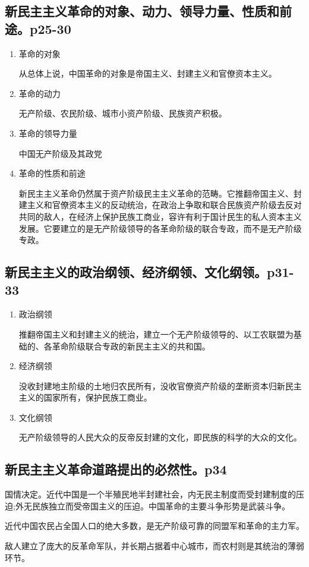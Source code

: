 \documentclass[UTF8]{ctexart}
\begin{document}
\subsection{新民主主义革命的对象、动力、领导力量、性质和前途。p25-30}
\begin{enumerate}[(1)]
\item 革命的对象
\par 从总体上说，中国革命的对象是帝国主义、封建主义和官僚资本主义。
\item 革命的动力
\par 无产阶级、农民阶级、城市小资产阶级、民族资产积极。
\item 革命的领导力量
\par 中国无产阶级及其政党
\item 革命的性质和前途
\par 新民主主义革命仍然属于资产阶级民主主义革命的范畴。它推翻帝国主义、封建主义和官僚资本主义的反动统治，在政治上争取和联合民族资产阶级去反对共同的敌人，在经济上保护民族工商业，容许有利于国计民生的私人资本主义发展。它要建立的是无产阶级领导的各革命阶级的联合专政，而不是无产阶级专政。        
\end{enumerate}
\subsection{新民主主义的政治纲领、经济纲领、文化纲领。p31-33}
\begin{enumerate}[(1)]
\item 政治纲领
\par 推翻帝国主义和封建主义的统治，建立一个无产阶级领导的、以工农联盟为基础的、各革命阶级联合专政的新民主主义的共和国。
\item 经济纲领
\par 没收封建地主阶级的土地归农民所有，没收官僚资产阶级的垄断资本归新民主主义的国家所有，保护民族工商业。
\item 文化纲领
\par 无产阶级领导的人民大众的反帝反封建的文化，即民族的科学的大众的文化。
\end{enumerate}
\subsection{新民主主义革命道路提出的必然性。p34}
\par 国情决定。近代中国是一个半殖民地半封建社会，内无民主制度而受封建制度的压迫;外无民族独立而受帝国主义的压迫。中国革命的主要斗争形势是武装斗争。
\par 近代中国农民占全国人口的绝大多数，是无产阶级可靠的同盟军和革命的主力军。
\par 敌人建立了庞大的反革命军队，并长期占据着中心城市，而农村则是其统治的薄弱环节。
\end{document}
